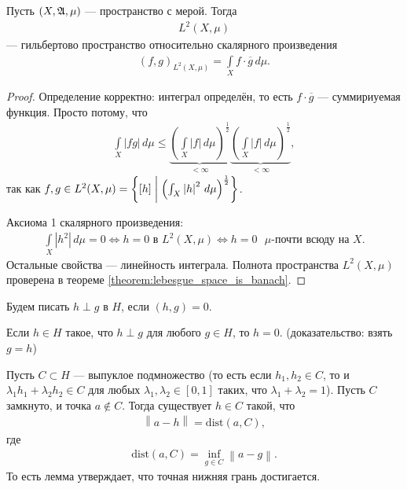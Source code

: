 \begin{exmpl}
 Пусть $(X, \mathfrak{A}, \mu)$ --- пространство с мерой. Тогда \begin{align*}
  L^{2}(X, \mu)
 \end{align*} --- гильбертово пространство относительно скалярного произведения \begin{align*}
 (f, g)_{L^{2}(X, \mu)} = \int\limits_{X} f \cdot \overline{g} \, d\mu  
 .\end{align*} 
\end{exmpl}
\begin{proof}
 Определение корректно: интеграл определён, то есть $f\cdot \overline{g}$ --- суммириуемая функция. Просто потому, что \begin{align*}
  \int\limits_{X} \left| fg \right| \, d\mu  \leqslant \underbrace{\left( \int\limits_{X} \left| f \right| \, d\mu \right)^{\frac{1}{2}}}_{< \infty}  \underbrace{\left( \int\limits_{X} \left| f \right| \, d\mu \right)^{\frac{1}{2}}}_{< \infty}
 ,\end{align*} так как $f,g \in L^{2}(X, \mu) = \left\{ [h] \;\middle|\; \left( \int_{X} \left| h \right|^{2} \, d\mu   \right)^{\frac{1}{2}} \right\}$.

 Аксиома 1 скалярного произведения: \begin{align*}
  \int\limits_{X} \left| h^{2} \right| \, d\mu   = 0 \iff h = 0 \text{ в } L^{2}(X, \mu) \iff h=0 \text{ $\mu$-почти всюду на } X
 .\end{align*} Остальные свойства --- линейность интеграла. Полнота пространства $L^{2}(X, \mu)$ проверена в теореме \ref{theorem:lebesgue_space_is_banach}.
\end{proof}
\begin{df}
 Будем писать $h \perp g$ в $H$, если $(h, g) = 0$.
\end{df}
\begin{remrk}
 \label{remark:vector_orthogonal_to_all_is_zero_vector}
 Если $h \in H$ такое, что $h \perp g$ для любого $g \in H$, то $h = 0$. (доказательство: взять $g = h$)
\end{remrk}
\begin{lm}
\label{lemma:convex_sets_in_hilbert_spaces}
Пусть $C \subset H$ --- выпуклое подмножество (то есть если $h_1, h_2 \in C$, то и $\lambda_1 h_1 + \lambda_2 h_2 \in C$ для любых $\lambda_1, \lambda_2 \in [0,1]$ таких, что $\lambda_1 + \lambda_2 = 1$). Пусть $C$ замкнуто, и точка $a \notin C$. Тогда существует $h \in C$ такой, что \begin{align*}
 \left\| a - h \right\| = \mathrm{dist}(a, C)
,\end{align*} где \begin{align*}
\mathrm{dist}(a,C) = \inf_{g \in C} \left\| a - g \right\|
.\end{align*} То есть лемма утверждает, что точная нижняя грань достигается.
\end{lm}
